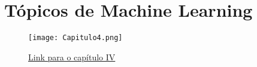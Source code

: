 \documentclass{beamer}
\begin{document}
\section{Tópicos de Machine Learning}

\begin{frame}

    \begin{figure}[ht]
        \centering
        \texttt{[image: Capitulo4.png]}
        \caption{\href{run:./capitulos/capitulo04/Capitulo04.pdf}{Link para o capítulo IV}}
    \end{figure}

\end{frame}
\end{document}
